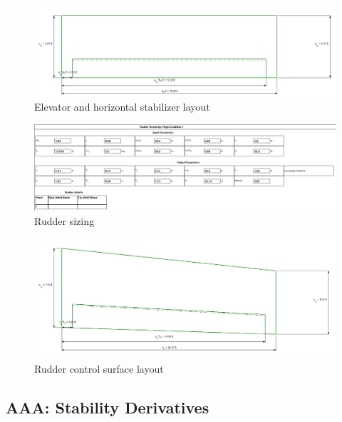 \documentclass[conf]{new-aiaa}
\begin{document}
\begin{figure}[H]
    \includegraphics[width=\textwidth]{Report3Printouts/Empannage/Horizontal_elevator_plot.png}
    \caption{Elevator and horizontal stabilizer layout}
    \label{fig:horizontal_elevator_plot}
\end{figure}

\begin{figure}[H]
    \includegraphics[width=\textwidth]{Report3Printouts/Empannage/Vertical_rudder_cropped.png}
    \caption{Rudder sizing}
    \label{fig:vertical_rudder}
\end{figure}

\begin{figure}[H]
    \includegraphics[width=\textwidth]{Report3Printouts/Empannage/Vertical_rudder_plot.png}
    \caption{Rudder control surface layout}
    \label{fig:vertical_rudder_plot}
\end{figure}


\subsection{AAA: Stability Derivatives}
\end{document}
